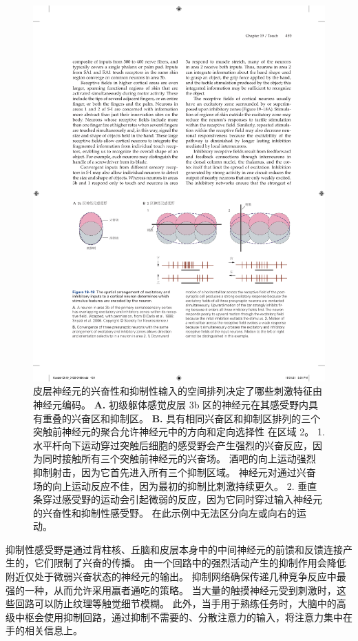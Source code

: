 \begin{figure}[htbp]
	\centering
	\includegraphics[width=1.0\linewidth]{chap19/fig_19_18}
	\caption{皮层神经元的兴奋性和抑制性输入的空间排列决定了哪些刺激特征由神经元编码。
		\textbf{A.} 初级躯体感觉皮层 3b 区的神经元在其感受野内具有重叠的兴奋区和抑制区\cite{dicarlo1998structure,sripati2006spatiotemporal}。
		\textbf{B.} 具有相同兴奋区和抑制区排列的三个突触前神经元的聚合允许神经元中的方向和定向选择性 在区域 2。 
		1. 水平杆向下运动穿过突触后细胞的感受野会产生强烈的兴奋反应，因为同时接触所有三个突触前神经元的兴奋场。
		酒吧的向上运动强烈抑制射击，因为它首先进入所有三个抑制区域。
		神经元对通过兴奋场的向上运动反应不佳，因为最初的抑制比刺激持续更久。
		2. 垂直条穿过感受野的运动会引起微弱的反应，因为它同时穿过输入神经元的兴奋性和抑制性感受野。
		在此示例中无法区分向左或向右的运动。}
	\label{fig:19_18}
\end{figure}


抑制性感受野是通过背柱核、丘脑和皮层本身中的中间神经元的前馈和反馈连接产生的，它们限制了兴奋的传播。 
由一个回路中的强烈活动产生的抑制作用会降低附近仅处于微弱兴奋状态的神经元的输出。
抑制网络确保传递几种竞争反应中最强的一种，从而允许采用赢者通吃的策略。
当大量的触摸神经元受到刺激时，这些回路可以防止纹理等触觉细节模糊。
此外，当手用于熟练任务时，大脑中的高级中枢会使用抑制回路，通过抑制不需要的、分散注意力的输入，将注意力集中在手的相关信息上。


